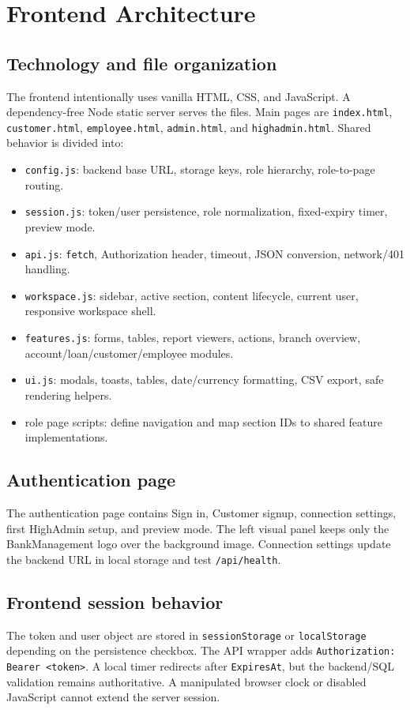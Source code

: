 \documentclass[11pt,a4paper,oneside]{report}
\begin{document}
\chapter{Frontend Architecture}
\section{Technology and file organization}
The frontend intentionally uses vanilla HTML, CSS, and JavaScript. A dependency-free Node static server serves the files. Main pages are \texttt{index.html}, \texttt{customer.html}, \texttt{employee.html}, \texttt{admin.html}, and \texttt{highadmin.html}. Shared behavior is divided into:
\begin{itemize}
\item \texttt{config.js}: backend base URL, storage keys, role hierarchy, role-to-page routing.
\item \texttt{session.js}: token/user persistence, role normalization, fixed-expiry timer, preview mode.
\item \texttt{api.js}: \texttt{fetch}, Authorization header, timeout, JSON conversion, network/401 handling.
\item \texttt{workspace.js}: sidebar, active section, content lifecycle, current user, responsive workspace shell.
\item \texttt{features.js}: forms, tables, report viewers, actions, branch overview, account/loan/customer/employee modules.
\item \texttt{ui.js}: modals, toasts, tables, date/currency formatting, CSV export, safe rendering helpers.
\item role page scripts: define navigation and map section IDs to shared feature implementations.
\end{itemize}

\section{Authentication page}
The authentication page contains Sign in, Customer signup, connection settings, first HighAdmin setup, and preview mode. The left visual panel keeps only the BankManagement logo over the background image. Connection settings update the backend URL in local storage and test \texttt{/api/health}.

\section{Frontend session behavior}
The token and user object are stored in \texttt{sessionStorage} or \texttt{localStorage} depending on the persistence checkbox. The API wrapper adds \texttt{Authorization: Bearer <token>}. A local timer redirects after \texttt{ExpiresAt}, but the backend/SQL validation remains authoritative. A manipulated browser clock or disabled JavaScript cannot extend the server session.
\end{document}
